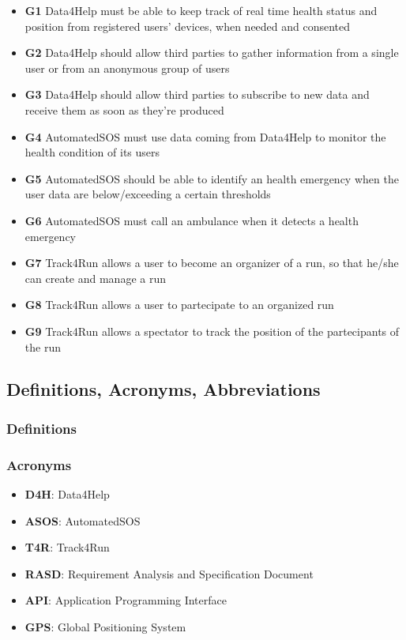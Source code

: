 \begin{itemize}
\item \textbf{G1} Data4Help must be able to keep track of real time health status and position from registered users' devices, when needed and consented
\item \textbf{G2} Data4Help should allow third parties to gather information from a single user or from an anonymous group of users
\item \textbf{G3} Data4Help should allow third parties to subscribe to new data and receive them as soon as they're produced
\item \textbf{G4} AutomatedSOS must use data coming from Data4Help to monitor the health condition of its users
\item \textbf{G5} AutomatedSOS should be able to identify an health emergency when the user data are below/exceeding a certain thresholds
\item \textbf{G6} AutomatedSOS must call an ambulance when it detects a health emergency
\item \textbf{G7} Track4Run allows a user to become an organizer of a run, so that he/she can create and manage a run
\item \textbf{G8} Track4Run allows a user to partecipate to an organized run
\item \textbf{G9} Track4Run allows a spectator to track the position of the partecipants of the run 
\end{itemize}
\subsection{Definitions, Acronyms, Abbreviations}
\subsubsection{Definitions}
\subsubsection{Acronyms}
\begin{itemize}
\item \textbf{D4H}: Data4Help
\item \textbf{ASOS}: AutomatedSOS
\item \textbf{T4R}: Track4Run
\item \textbf{RASD}: Requirement Analysis and Specification Document
\item \textbf{API}: Application Programming Interface
\item \textbf{GPS}: Global Positioning System

\end{itemize}

